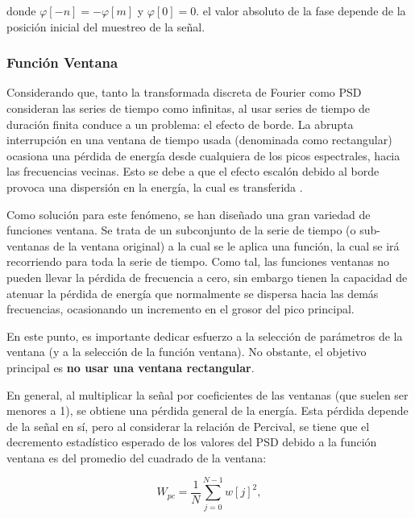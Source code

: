 donde $\varphi [-n] = -\varphi[m]$ y $\varphi[0]=0$. el valor absoluto de la fase depende de la posición inicial del muestreo de la señal.
\vspace{1 em}

\subsubsection{Función Ventana}

Considerando que, tanto la transformada discreta de Fourier como PSD consideran las series de tiempo como infinitas, al usar series de tiempo de duración finita conduce a un problema: el efecto de borde. La abrupta interrupción en una ventana de tiempo usada (denominada como rectangular) ocasiona una pérdida de energía desde cualquiera de los picos espectrales, hacia las frecuencias vecinas. Esto se debe a que el efecto escalón debido al borde provoca una dispersión en la energía, la cual es transferida \parencite{book_analysis_Method_multiSp_data}.
\vspace{1 em}

Como solución para este fenómeno, se han diseñado una gran variedad de funciones ventana. Se trata de un subconjunto de la serie de tiempo (o sub-ventanas de la ventana original) a la cual se le aplica una función, la cual se irá recorriendo para toda la serie de tiempo. Como tal, las funciones ventanas no pueden llevar la pérdida de frecuencia a cero, sin embargo tienen la capacidad de atenuar la pérdida de energía que normalmente se dispersa hacia las demás frecuencias, ocasionando un incremento en el grosor del pico principal.
\vspace{1 em}

En este punto, es importante dedicar esfuerzo a la selección de parámetros de la ventana (y a la selección de la función ventana). No obstante, el objetivo principal es \textbf{no usar una ventana rectangular}.
\vspace{1 em}

En general, al multiplicar la señal por coeficientes de las ventanas (que suelen ser menores a 1), se obtiene una pérdida general de la energía. Esta pérdida depende de la señal en sí, pero al considerar la relación de Percival, se tiene que el decremento estadístico esperado de los valores del PSD debido a la función ventana es del promedio del cuadrado de la ventana:

\begin{equation}
    W_{pc} = \frac{1}{N} \sum_{j=0}^{N-1} w[j]^2,
\end{equation}

